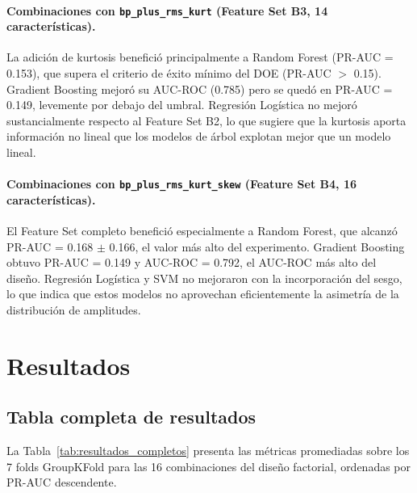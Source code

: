 \documentclass[12pt,a4paper]{article}
\begin{document}
\paragraph{Combinaciones con \texttt{bp\_plus\_rms\_kurt} (Feature Set B3, 14 características).}
La adición de kurtosis benefició principalmente a Random Forest (PR-AUC = 0.153), que
supera el criterio de éxito mínimo del DOE (PR-AUC $>$ 0.15). Gradient Boosting mejoró
su AUC-ROC (0.785) pero se quedó en PR-AUC = 0.149, levemente por debajo del umbral.
Regresión Logística no mejoró sustancialmente respecto al Feature Set B2, lo que sugiere
que la kurtosis aporta información no lineal que los modelos de árbol explotan mejor que
un modelo lineal.

\paragraph{Combinaciones con \texttt{bp\_plus\_rms\_kurt\_skew} (Feature Set B4, 16 características).}
El Feature Set completo benefició especialmente a Random Forest, que alcanzó
PR-AUC = 0.168 $\pm$ 0.166, el valor más alto del experimento. Gradient Boosting
obtuvo PR-AUC = 0.149 y AUC-ROC = 0.792, el AUC-ROC más alto del diseño. Regresión
Logística y SVM no mejoraron con la incorporación del sesgo, lo que indica que estos
modelos no aprovechan eficientemente la asimetría de la distribución de amplitudes.

\section{Resultados}

\subsection{Tabla completa de resultados}

La Tabla~\ref{tab:resultados_completos} presenta las métricas promediadas sobre los
7 folds GroupKFold para las 16 combinaciones del diseño factorial, ordenadas por
PR-AUC descendente.
\end{document}
